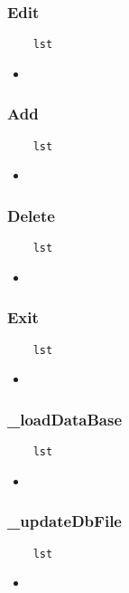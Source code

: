 \subsubsection{Edit}

\begin{lstlisting}
    lst
\end{lstlisting}

\begin{itemize}
    \item \verb||
\end{itemize}

\subsubsection{Add}

\begin{lstlisting}
    lst
\end{lstlisting}

\begin{itemize}
    \item \verb||
\end{itemize}

\subsubsection{Delete}

\begin{lstlisting}
    lst
\end{lstlisting}

\begin{itemize}
    \item \verb||
\end{itemize}

\subsubsection{Exit}

\begin{lstlisting}
    lst
\end{lstlisting}

\begin{itemize}
    \item \verb||
\end{itemize}

\subsubsection{\_loadDataBase}

\begin{lstlisting}
    lst
\end{lstlisting}

\begin{itemize}
    \item \verb||
\end{itemize}

\subsubsection{\_updateDbFile}

\begin{lstlisting}
    lst
\end{lstlisting}

\begin{itemize}
    \item \verb||
\end{itemize}

